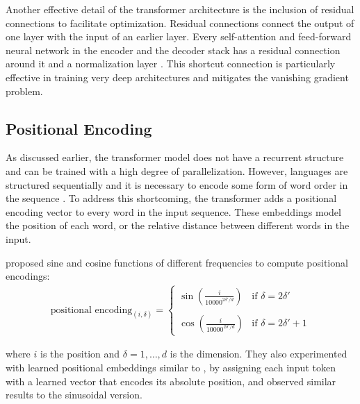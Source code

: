 Another effective detail of the transformer architecture is the inclusion of residual connections \citep{He2016DeepRL} to facilitate optimization.
Residual connections connect the output of one layer with the input of an earlier layer.
Every self-attention and feed-forward neural network in the encoder and the decoder stack has a residual connection around it and a normalization layer \citep{Ba2016LayerN}.
This shortcut connection is particularly effective in training very deep architectures and mitigates the vanishing gradient problem. 

\subsection{Positional Encoding}

As discussed earlier, the transformer model does not have a recurrent structure and can be trained with a high degree of parallelization. 
However, languages are structured sequentially and it is necessary to encode some form of word order in the sequence \citep{tran-etal-2018-importance}. 
To address this shortcoming, the transformer adds a positional encoding vector to every word in the input sequence. 
These embeddings model the position of each word, or the relative distance between different words in the input.

\citet{vaswani2017attention} proposed sine and cosine functions of different frequencies to compute positional encodings:
\begin{align}
\text{positional encoding}_{(i, \delta)} = \begin{cases}
    \sin (\frac{i}{10000^{2\delta'/d}}) & \text{if $\delta = 2\delta'$}\\
        \\[5pt]
    \cos (\frac{i}{10000^{2\delta'/d}}) & \text{if $\delta = 2\delta' + 1$}
  \end{cases}
\end{align}

\noindent where $i$ is the position and $\delta = 1, \ldots, d$ is the dimension.
They also experimented with learned positional embeddings similar to \citet{pmlr-v70-gehring17a}, by assigning each input token with a learned vector that encodes its absolute position, and observed similar results to the sinusoidal version. 

